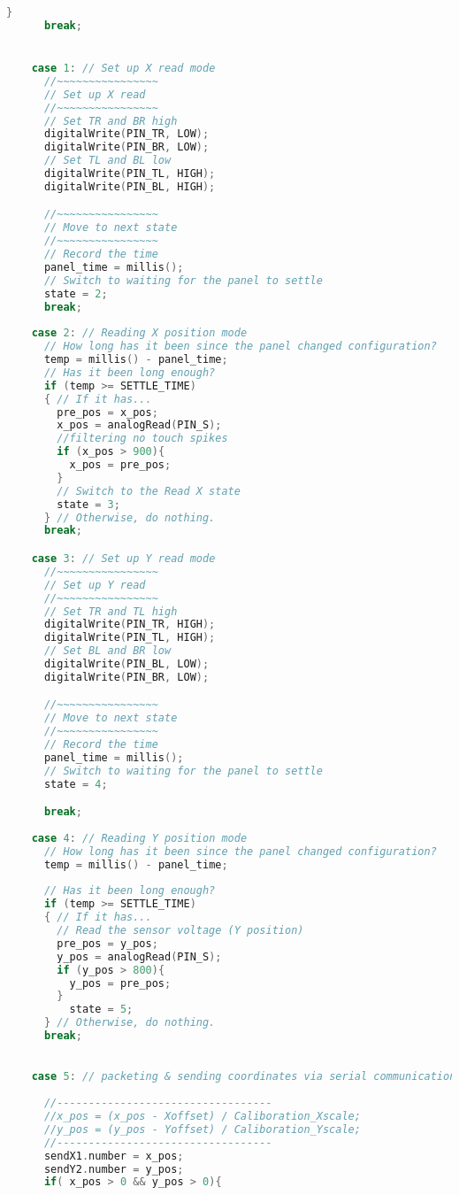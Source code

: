 \begin{lstlisting}[language=C++ , caption= Arduino full code for controlling the system by a simulink controller]
      }
      break;


    case 1: // Set up X read mode
      //~~~~~~~~~~~~~~~~
      // Set up X read
      //~~~~~~~~~~~~~~~~
      // Set TR and BR high
      digitalWrite(PIN_TR, LOW);
      digitalWrite(PIN_BR, LOW);
      // Set TL and BL low
      digitalWrite(PIN_TL, HIGH);
      digitalWrite(PIN_BL, HIGH);

      //~~~~~~~~~~~~~~~~
      // Move to next state
      //~~~~~~~~~~~~~~~~
      // Record the time
      panel_time = millis();
      // Switch to waiting for the panel to settle
      state = 2;
      break;
    
    case 2: // Reading X position mode
      // How long has it been since the panel changed configuration?
      temp = millis() - panel_time;
      // Has it been long enough?
      if (temp >= SETTLE_TIME)
      { // If it has...
        pre_pos = x_pos; 
        x_pos = analogRead(PIN_S);
        //filtering no touch spikes
        if (x_pos > 900){
          x_pos = pre_pos;
        }
        // Switch to the Read X state
        state = 3;
      } // Otherwise, do nothing.
      break;

    case 3: // Set up Y read mode
      //~~~~~~~~~~~~~~~~
      // Set up Y read
      //~~~~~~~~~~~~~~~~
      // Set TR and TL high
      digitalWrite(PIN_TR, HIGH);
      digitalWrite(PIN_TL, HIGH);
      // Set BL and BR low
      digitalWrite(PIN_BL, LOW);
      digitalWrite(PIN_BR, LOW);

      //~~~~~~~~~~~~~~~~
      // Move to next state
      //~~~~~~~~~~~~~~~~
      // Record the time
      panel_time = millis();
      // Switch to waiting for the panel to settle
      state = 4;

      break;
      
    case 4: // Reading Y position mode
      // How long has it been since the panel changed configuration?
      temp = millis() - panel_time;
      
      // Has it been long enough?
      if (temp >= SETTLE_TIME)
      { // If it has...
        // Read the sensor voltage (Y position)
        pre_pos = y_pos; 
        y_pos = analogRead(PIN_S);
        if (y_pos > 800){
          y_pos = pre_pos;
        }
          state = 5;
      } // Otherwise, do nothing.
      break;
    

    case 5: // packeting & sending coordinates via serial communication
    
      //----------------------------------
      //x_pos = (x_pos - Xoffset) / Caliboration_Xscale;
      //y_pos = (y_pos - Yoffset) / Caliboration_Yscale;
      //----------------------------------
      sendX1.number = x_pos;
      sendY2.number = y_pos;
      if( x_pos > 0 && y_pos > 0){


\end{lstlisting}
